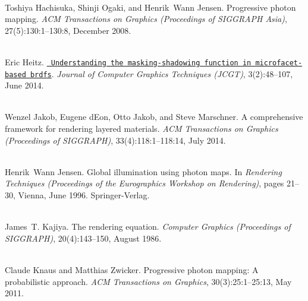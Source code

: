 \begin{DoxyDescription}
\item[\label{citelist_CITEREF_Hachisuka:2008:Progressive}%
\Hypertarget{citelist_CITEREF_Hachisuka:2008:Progressive}%
\mbox{[}7\mbox{]}]\hfill \\
Toshiya Hachisuka, Shinji Ogaki, and Henrik~Wann Jensen. Progressive photon mapping. {\itshape ACM Transactions on Graphics (Proceedings of SIGGRAPH Asia)}, 27(5)\+:130\+:1--130\+:8, December 2008. 


\item[\label{citelist_CITEREF_Heitz:2014:Microfacet}%
\Hypertarget{citelist_CITEREF_Heitz:2014:Microfacet}%
\mbox{[}8\mbox{]}]\hfill \\
Eric Heitz. \href{http://jcgt.org/published/0003/02/03/}{\texttt{ Understanding the masking-\/shadowing function in microfacet-\/based brdfs}}. {\itshape Journal of Computer Graphics Techniques (JCGT)}, 3(2)\+:48--107, June 2014.


\item[\label{citelist_CITEREF_Jakob:2014:Comprehensive}%
\Hypertarget{citelist_CITEREF_Jakob:2014:Comprehensive}%
\mbox{[}9\mbox{]}]\hfill \\
Wenzel Jakob, Eugene d\textquotesingle{}Eon, Otto Jakob, and Steve Marschner. A comprehensive framework for rendering layered materials. {\itshape ACM Transactions on Graphics (Proceedings of SIGGRAPH)}, 33(4)\+:118\+:1--118\+:14, July 2014. 


\item[\label{citelist_CITEREF_Jensen:1996:Global}%
\Hypertarget{citelist_CITEREF_Jensen:1996:Global}%
\mbox{[}10\mbox{]}]\hfill \\
Henrik~Wann Jensen. Global illumination using photon maps. In {\itshape Rendering Techniques (Proceedings of the Eurographics Workshop on Rendering)}, pages 21--30, Vienna, June 1996. Springer-\/\+Verlag. 


\item[\label{citelist_CITEREF_Kajiya:1986:Rendering}%
\Hypertarget{citelist_CITEREF_Kajiya:1986:Rendering}%
\mbox{[}11\mbox{]}]\hfill \\
James~T. Kajiya. The rendering equation. {\itshape Computer Graphics (Proceedings of SIGGRAPH)}, 20(4)\+:143--150, August 1986. 


\item[\label{citelist_CITEREF_Knaus:2011:Progressive}%
\Hypertarget{citelist_CITEREF_Knaus:2011:Progressive}%
\mbox{[}12\mbox{]}]\hfill \\
Claude Knaus and Matthias Zwicker. Progressive photon mapping\+: A probabilistic approach. {\itshape ACM Transactions on Graphics}, 30(3)\+:25\+:1--25\+:13, May 2011. 



\end{DoxyDescription}
